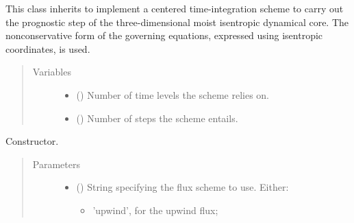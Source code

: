 \documentclass[letterpaper,10pt,english]{sphinxmanual}
\begin{document}
\begin{fulllineitems}
\label{\detokenize{api:tasmania.dycore.prognostic_isentropic_nonconservative_centered.PrognosticIsentropicNonconservativeCentered}}
This class inherits {\hyperref[\detokenize{api:tasmania.dycore.prognostic_isentropic_nonconservative.PrognosticIsentropicNonconservative}]{}}
to implement a centered time-integration scheme to carry out the prognostic step of the three-dimensional
moist isentropic dynamical core. The nonconservative form of the governing equations, expressed using isentropic
coordinates, is used.
\begin{quote}\begin{description}
\item[{Variables}] \leavevmode\begin{itemize}
\item {} 
{\hyperref[\detokenize{api:tasmania.dycore.dycore.DynamicalCore.time_levels}]{}} () \textendash{} Number of time levels the scheme relies on.

\item {} 
 () \textendash{} Number of steps the scheme entails.

\end{itemize}

\end{description}\end{quote}

\begin{fulllineitems}
\label{\detokenize{api:tasmania.dycore.prognostic_isentropic_nonconservative_centered.PrognosticIsentropicNonconservativeCentered.__init__}}
Constructor.
\begin{quote}\begin{description}
\item[{Parameters}] \leavevmode\begin{itemize}
\item {} 
 () \textendash{} 
String specifying the flux scheme to use. Either:
\begin{itemize}
\item {} 
’upwind’, for the upwind flux;


\end{itemize}
\end{itemize}
\end{description}
\end{quote}
\end{fulllineitems}
\end{fulllineitems}
\end{document}
